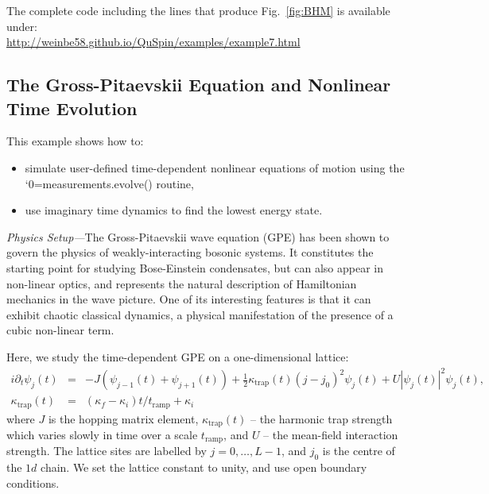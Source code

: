 \documentclass{SciPost}
\newcommand\0{\scalebox{-1}[1]{0}}
\let\svttfamily\ttfamily
\renewcommand\ttfamily{\svttfamily\catcode`0=\active }
\renewcommand\texttt{\bgroup\ttfamily\texttthelp}
\def\texttthelp#1{#1\egroup}
\newcommand{\BHLcode}{example7.py}
\begin{document}


The complete code including the lines that produce Fig.~\ref{fig:BHM} is available under:\\

\href{http://weinbe58.github.io/QuSpin/examples/example7.html}{http://weinbe58.github.io/QuSpin/examples/example7.html}\\

\subsection{The Gross-Pitaevskii Equation and Nonlinear Time Evolution}
\label{subsec:GP_dynamics}

This example shows how to:
\begin{itemize}
	\item simulate user-defined time-dependent nonlinear equations of motion using the \\ \texttt{measurements.evolve()} routine,
	\item use imaginary time dynamics to find the lowest energy state.
\end{itemize}

\noindent\emph{Physics Setup---}The Gross-Pitaevskii wave equation (GPE) has been shown to govern the physics of weakly-interacting bosonic systems. It constitutes the starting point for studying Bose-Einstein condensates, but can also appear in non-linear optics, and represents the natural description of Hamiltonian mechanics in the wave picture. One of its interesting features is that it can exhibit chaotic classical dynamics, a physical manifestation of the presence of a cubic non-linear term.

Here, we study the time-dependent GPE on a one-dimensional lattice:
\begin{eqnarray}
i\partial_t\psi_j(t) &=& -J\left( \psi_{j-1}(t) + \psi_{j+1}(t)\right) + \frac{1}{2}\kappa_\mathrm{trap}(t)(j-j_0)^2\psi_j(t) + U|\psi_j(t)|^2\psi_j(t), \nonumber \\
\kappa_\mathrm{trap}(t)&=&(\kappa_f-\kappa_i)t/t_\mathrm{ramp}+ \kappa_i
\label{eq:GPE}
\end{eqnarray}
where $J$ is the hopping matrix element, $\kappa_\mathrm{trap}(t)$ -- the harmonic trap strength which varies slowly in time over a scale $t_\mathrm{ramp}$, and $U$ -- the mean-field interaction strength. The lattice sites are labelled by $j=0,\dots,L-1$, and $j_0$ is the centre of the $1d$ chain. We set the lattice constant to unity, and use open boundary conditions.
\end{document}
